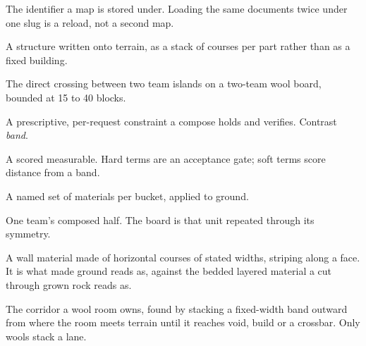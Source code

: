 \begin{description}[leftmargin=0pt,style=nextline,itemsep=3pt,font=\normalfont\sffamily\bfseries]
\item[Slug] The identifier a map is stored under. Loading the same documents twice
  under one slug is a reload, not a second map.

\item[Stamp] A structure written onto terrain, as a stack of courses per part rather
  than as a fixed building.

\item[Strait] The direct crossing between two team islands on a two-team wool board,
  bounded at 15 to 40 blocks.

\item[Target] A prescriptive, per-request constraint a compose holds and verifies.
  Contrast \emph{band}.

\item[Term] A scored measurable. Hard terms are an acceptance gate; soft terms score
  distance from a band.

\item[Theme] A named set of materials per bucket, applied to ground.

\item[Unit] One team's composed half. The board is that unit repeated through its
  symmetry.

\item[Wall run] A wall material made of horizontal courses of stated widths, striping
  along a face. It is what made ground reads as, against the bedded layered material a
  cut through grown rock reads as.

\item[Wool lane] The corridor a wool room owns, found by stacking a fixed-width band
  outward from where the room meets terrain until it reaches void, build or a
  crossbar. Only wools stack a lane.

\end{description}
